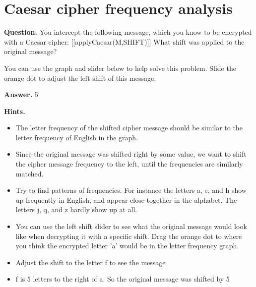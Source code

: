 \documentclass{article}
\begin{document}
\section*{Caesar cipher frequency analysis}
\textbf{Question.} You intercept the following message, which you know to be encrypted with a Caesar cipher:
                    [[applyCaesar(M,SHIFT)]]
                    What shift was applied to the original message?

                    

                    You can use the graph and slider below to help solve this problem.
                    Slide the orange dot to adjust the left shift of this message.

\textbf{Answer.} 5

\textbf{Hints.}
\begin{itemize}
  \item The letter frequency of the shifted cipher message should
            be similar to the letter frequency of English in the graph.
  \item Since the original message was shifted right by some value, we want to shift the
                cipher message frequency
                to the left, until the frequencies are similarly matched.
  \item Try to find patterns of frequencies. For instance the letters a, e, and
                h show up frequently in English, and appear close together in the alphabet.
                The letters j, q, and z hardly show up at all.
  \item You can use the left shift slider to see what the original message would look like when decrypting it with a specific shift. Drag the
                orange dot to where you think the encrypted letter 'a' would be
                in the letter frequency graph.
  \item Adjust the shift to the letter f to see the message
  \item f is 5 letters to the
                right of a. So the original message was shifted by 5
\end{itemize}
\end{document}

